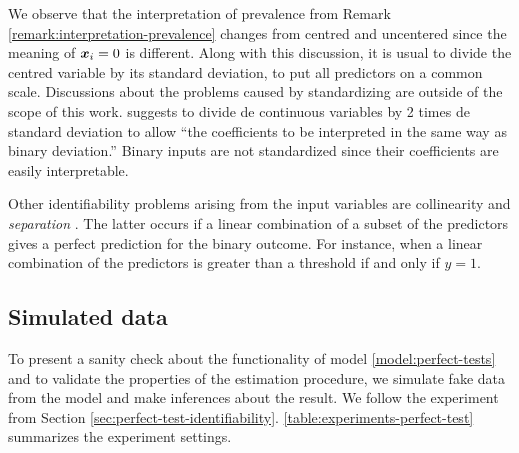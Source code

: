 We observe that the interpretation of prevalence from Remark
\ref{remark:interpretation-prevalence} changes from centred and
uncentered since the meaning of $\boldsymbol{x}_i = 0$ is different. Along with this
discussion, it is usual to divide the centred variable by its
standard deviation, to put all predictors on a common scale. Discussions about
the problems caused by standardizing are outside of the scope of this work.
\textcite{gelman2008scaling} suggests to divide de continuous variables by 2
times de standard deviation to allow ``the coefficients to be interpreted in
the same way as binary deviation.'' \cite[p. 2867]{gelman2008scaling} Binary
inputs are not standardized since their coefficients are easily interpretable.

Other identifiability problems arising from the input variables are
collinearity and {\em separation} \cite[p. 1360-1361]{gelman2008weakly}.
The latter occurs if a linear combination of a subset of the predictors gives
a perfect prediction for the binary outcome. For instance, when a linear
combination of the predictors is greater than a threshold if and only if $y =
  1$.

\subsection{Simulated data}

To present a sanity check about the functionality of model
\eqref{model:perfect-tests} and to validate the properties of the estimation
procedure, we simulate fake data from the model and make inferences about the
result. We follow the experiment from Section
\ref{sec:perfect-test-identifiability}.
\autoref{table:experiments-perfect-test} summarizes the experiment
settings.

